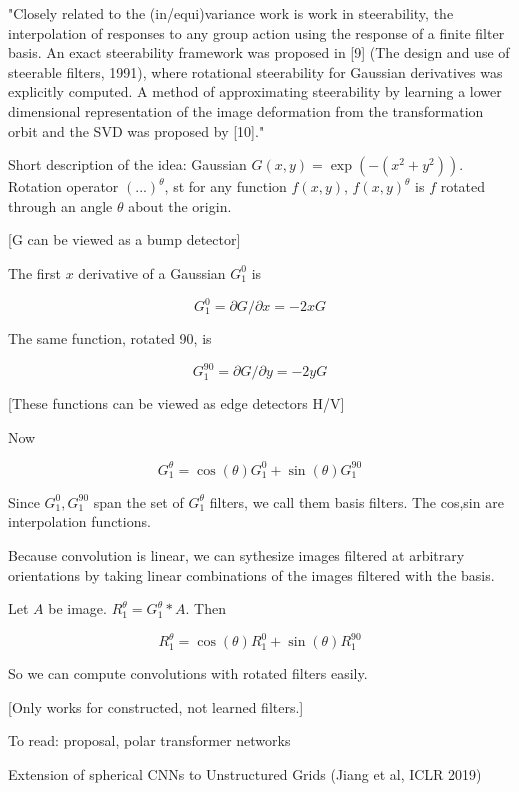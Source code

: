 \documentclass[english]{article}
\begin{document}
\item "Closely related to the (in/equi)variance work is work in steerability, the interpolation of responses to any
group action using the response of a finite filter basis. An exact steerability framework was proposed in [9] (The design and use of steerable filters, 1991),
where rotational steerability for Gaussian derivatives was explicitly computed. A method of approximating steerability by learning a lower dimensional representation of the image deformation from the transformation
orbit and the SVD was proposed by [10]."


Short description of the idea: Gaussian $G(x,y) = \exp(-(x^2+y^2))$. Rotation operator $(...)^\theta$, st for any function $f(x,y)$, $f(x,y)^\theta$ is $f$ rotated through an angle $\theta$ about the origin. 

[G can be viewed as a bump detector]

The first $x$ derivative of a Gaussian $G_1^0$ is 

$$G_1^0 = \partial G/\partial x = -2x G$$

The same function, rotated 90, is 

$$G_1^{90} = \partial G/\partial y = -2y G$$

[These functions can be viewed as edge detectors H/V]

Now 

$$G_1^{\theta} = \cos(\theta) G_1^0 + \sin(\theta) G_1^{90} $$

Since $G_1^0, G_1^{90}$ span the set of $G_1^{\theta}$ filters, we call them basis filters. The cos,sin are interpolation functions.

Because convolution is linear, we can sythesize images filtered at arbitrary orientations by taking linear combinations of the images filtered with the basis. 

Let $A$ be image. $R_1^{\theta} = G_1^{\theta}*A$. Then 

$$R_1^{\theta} = \cos(\theta) R_1^0 + \sin(\theta) R_1^{90} $$

So we can compute convolutions with rotated filters easily.

[Only works for constructed, not learned filters.]

\item To read: proposal, polar transformer networks

\item Extension of spherical CNNs to Unstructured Grids (Jiang et al, ICLR 2019)

\eitem 
\end{document}
